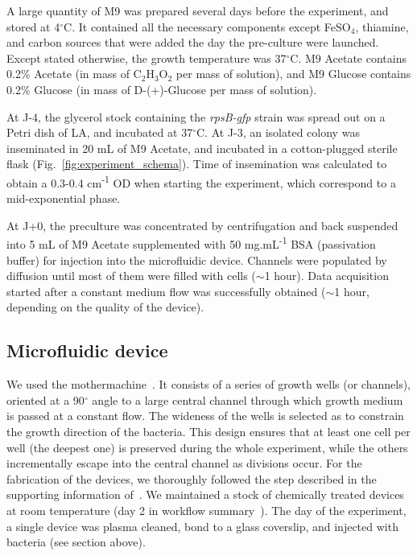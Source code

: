 A large quantity of M9 was prepared several days before the experiment, and stored at 4$^\circ$C.
It contained all the necessary components except FeSO$_4$, thiamine, and carbon sources that were added the day the pre-culture were launched.
Except stated otherwise, the growth temperature was 37$^\circ$C.
M9 Acetate contains 0.2\% Acetate (in mass of C$_2$H$_3$O$_2$ per mass of solution), and M9 Glucose contains 0.2\% Glucose (in mass of D-(+)-Glucose per mass of solution).

At J-4, the glycerol stock containing the \textit{rpsB-gfp} strain was spread out on a Petri dish of LA, and incubated at 37$^\circ$C.
At J-3, an isolated colony was inseminated in 20 mL of M9 Acetate, and incubated in a cotton-plugged sterile flask (Fig.~\ref{fig:experiment_schema}).
Time of insemination was calculated to obtain a 0.3-0.4 cm\textsuperscript{-1} OD when starting the experiment, which correspond to a mid-exponential phase.

At J+0, the preculture was concentrated by centrifugation and back suspended into 5 mL of M9 Acetate supplemented with 50 mg.mL\textsuperscript{-1} BSA (passivation	buffer) for injection into the microfluidic device.
Channels were populated by diffusion until most of them were filled with cells ($\sim$1 hour).
Data acquisition started after a constant medium flow was successfully obtained ($\sim$1 hour, depending on the quality of the device).

\subsection{Microfluidic device}
\label{sec:microflu}

We used the mothermachine~\cite{wang_robust_2010}.
It consists of a series of growth wells (or channels), oriented at a 90$^\circ$ angle to a large central channel through which growth medium is passed at a constant flow.
The wideness of the wells is selected as to constrain the growth direction of the bacteria.
This design ensures that at least one cell per well (the deepest one) is preserved during the whole experiment, while the others incrementally escape into the central channel as divisions occur.
For the fabrication of the devices, we thoroughly followed the step described in the supporting information of~\cite{wang_robust_2010}.
We maintained a stock of chemically treated devices at room temperature (day 2 in workflow summary~\cite{wang_robust_2010}).
The day of the experiment, a single device was plasma cleaned, bond to a glass coverslip, and injected with bacteria (see section above).

